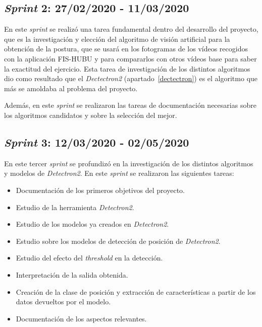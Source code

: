 \subsection{\textit{Sprint} 2: 27/02/2020 - 11/03/2020}
En este \textit{sprint} se realizó una tarea fundamental dentro del desarrollo del proyecto, que es la investigación y elección del algoritmo de visión artificial para la obtención de la postura, que se usará en los fotogramas de los vídeos recogidos con la aplicación FIS-HUBU y para compararlos con otros vídeos base para saber la exactitud del ejercicio. Esta tarea de investigación de los distintos algoritmos dio como resultado que el \textit{Dectectron2} (apartado~\ref{dectectron}) es el algoritmo que más se amoldaba al problema del proyecto.

Además, en este \textit{sprint} se realizaron las tareas de documentación necesarias sobre los algoritmos candidatos y sobre la selección del mejor.
\subsection{\textit{Sprint} 3: 12/03/2020 - 02/05/2020}
En este tercer \textit{sprint} se profundizó en la investigación de los distintos algoritmos y modelos de \textit{Detectron2}. En este \textit{sprint} se realizaron las siguientes tareas:
\begin{itemize}
	\item Documentación de los primeros objetivos del proyecto.
	\item Estudio de la herramienta \textit{Detectron2}.
	\item Estudio de los modelos ya creados en \textit{Detectron2}.
	\item Estudio sobre los modelos de detección de posición de \textit{Detectron2}.
	\item Estudio del efecto del \textit{threshold} en la detección.
	\item Interpretación de la salida obtenida.
	\item Creación de la clase de posición y extracción de características a partir de los datos devueltos por el modelo.
	\item Documentación de los aspectos relevantes.
\end{itemize}


